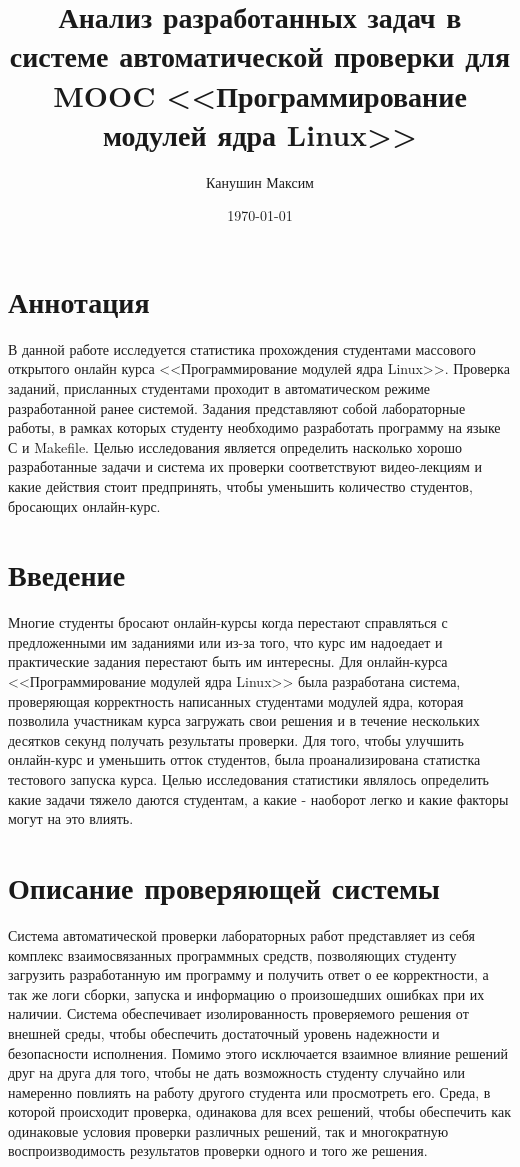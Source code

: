 \documentclass[a4paper,12pt]{article}
\author{Канушин Максим}
\title{Анализ разработанных задач в системе автоматической проверки для MOOC <<Программирование модулей ядра Linux>>}
\date{\today}
\begin{document}

\setlength{\droptitle}{-75pt}
\maketitle
\section{Аннотация}
В данной работе исследуется статистика прохождения студентами массового открытого онлайн курса <<Программирование модулей ядра Linux>>\cite{stepic}. Проверка заданий, присланных студентами проходит в автоматическом режиме разработанной ранее системой. Задания представляют собой лабораторные работы, в рамках которых студенту необходимо разработать программу на языке С\cite{c} и Makefile\cite{makefile}. Целью исследования является определить насколько хорошо разработанные задачи и система их проверки соответствуют видео-лекциям и какие действия стоит предпринять, чтобы уменьшить количество студентов, бросающих онлайн-курс.

\section{Введение}
Многие студенты бросают онлайн-курсы когда перестают справляться с предложенными им заданиями или из-за того, что курс им надоедает и практические задания перестают быть им интересны. Для онлайн-курса <<Программирование модулей ядра Linux>> была разработана система, проверяющая корректность написанных студентами модулей ядра, которая позволила участникам курса загружать свои решения и в течение нескольких десятков секунд получать результаты проверки. Для того, чтобы улучшить онлайн-курс и уменьшить отток студентов, была проанализирована статистка тестового запуска курса. Целью исследования статистики являлось определить какие задачи тяжело даются студентам, а какие - наоборот легко и какие факторы могут на это влиять.


\section{Описание проверяющей системы}
Система автоматической проверки лабораторных работ представляет из себя комплекс взаимосвязанных программных средств, позволяющих студенту загрузить разработанную им программу и получить ответ о ее корректности, а так же логи сборки, запуска и информацию о произошедших ошибках при их наличии. Система обеспечивает изолированность проверяемого решения от внешней среды, чтобы обеспечить достаточный уровень надежности и безопасности исполнения. Помимо этого исключается взаимное влияние решений друг на друга для того, чтобы не дать возможность студенту случайно или намеренно повлиять на работу другого студента или просмотреть его. Среда, в которой происходит проверка, одинакова для всех решений, чтобы обеспечить как одинаковые условия проверки различных решений, так и многократную воспроизводимость результатов проверки одного и того же решения.
\end{document}
